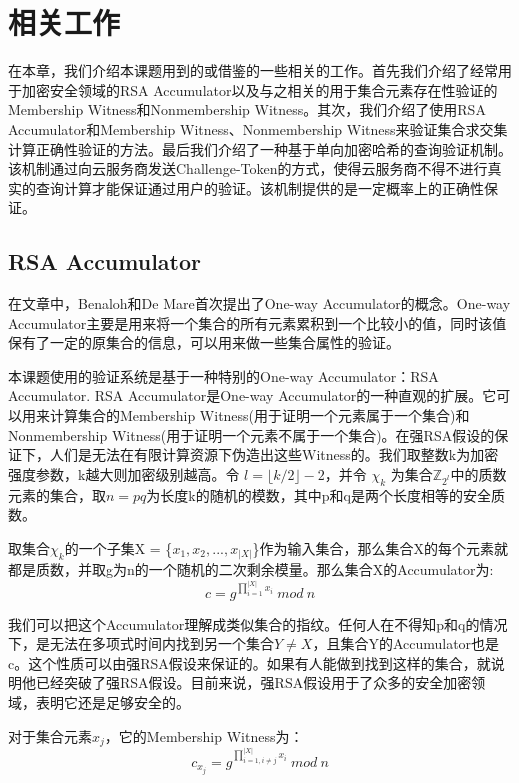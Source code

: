 \chapter{相关工作}
\label{chap:relatedwork}
在本章，我们介绍本课题用到的或借鉴的一些相关的工作。首先我们介绍了经常用于加密安全领域的RSA Accumulator以及与之相关的用于集合元素存在性验证的Membership Witness和Nonmembership Witness。其次，我们介绍了使用RSA Accumulator和Membership Witness、Nonmembership Witness来验证集合求交集计算正确性验证的方法。最后我们介绍了一种基于单向加密哈希的查询验证机制。该机制通过向云服务商发送Challenge-Token的方式，使得云服务商不得不进行真实的查询计算才能保证通过用户的验证。该机制提供的是一定概率上的正确性保证。

\section{RSA Accumulator}
在文章\cite{benaloh1994one}中，Benaloh和De Mare首次提出了One-way Accumulator的概念。One-way Accumulator主要是用来将一个集合的所有元素累积到一个比较小的值，同时该值保有了一定的原集合的信息，可以用来做一些集合属性的验证。

本课题使用的验证系统是基于一种特别的One-way Accumulator：RSA Accumulator.
RSA Accumulator是One-way Accumulator的一种直观的扩展。它可以用来计算集合的Membership Witness(用于证明一个元素属于一个集合)和Nonmembership Witness(用于证明一个元素不属于一个集合)。在强RSA假设的保证下，人们是无法在有限计算资源下伪造出这些Witness的。我们取整数k为加密强度参数，k越大则加密级别越高。令 $l = \lfloor k/2 \rfloor - 2$，并令 $\chi_k$ 为集合$\mathbb{Z}_{2^l}$中的质数元素的集合，取$n = pq$为长度k的随机的模数，其中p和q是两个长度相等的安全质数。

取集合$\chi_k$的一个子集X = \{$x_1, x_2, ... , x_{|X|}$\}作为输入集合，那么集合X的每个元素就都是质数，并取g为n的一个随机的二次剩余模量。那么集合X的Accumulator为:
\begin{equation} c = g^{\prod_{i = 1}^{|X|} x_i}\ mod\ n \end{equation}

我们可以把这个Accumulator理解成类似集合的指纹。任何人在不得知p和q的情况下，是无法在多项式时间内找到另一个集合$Y \neq X$，且集合Y的Accumulator也是c。这个性质可以由强RSA假设来保证的。如果有人能做到找到这样的集合，就说明他已经突破了强RSA假设。目前来说，强RSA假设用于了众多的安全加密领域，表明它还是足够安全的。

对于集合元素$x_j$，它的Membership Witness为：
\begin{equation} \label{eq:sw} c_{x_j} = g^{\prod_{i=1, i \ne j}^{|X|} x_i}\ mod\ n \end{equation}

